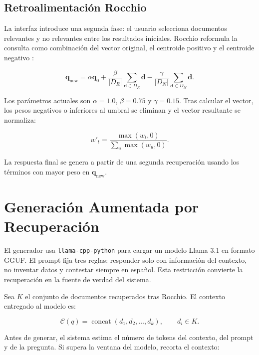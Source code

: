 \documentclass[a4paper]{llncs}
\begin{document}
\subsection{Retroalimentación Rocchio}

La interfaz introduce una segunda fase: el usuario selecciona documentos relevantes y no relevantes entre los resultados iniciales. Rocchio reformula la consulta como combinación del vector original, el centroide positivo y el centroide negativo \cite{rocchio1971relevance}:

\begin{equation}
\mathbf{q}_{\mathrm{new}}=
\alpha \mathbf{q}_0+
\frac{\beta}{|D_R|}\sum_{\mathbf{d}\in D_R}\mathbf{d}
-
\frac{\gamma}{|D_N|}\sum_{\mathbf{d}\in D_N}\mathbf{d}.
\end{equation}

Los parámetros actuales son $\alpha=1.0$, $\beta=0.75$ y $\gamma=0.15$. Tras calcular el vector, los pesos negativos o inferiores al umbral se eliminan y el vector resultante se normaliza:

\begin{equation}
w'_t=
\frac{\max(w_t,0)}
{\sum_{u}\max(w_u,0)}.
\end{equation}

La respuesta final se genera a partir de una segunda recuperación usando los términos con mayor peso en $\mathbf{q}_{\mathrm{new}}$.

\section{Generación Aumentada por Recuperación}

El generador usa \texttt{llama-cpp-python} para cargar un modelo Llama 3.1 en formato GGUF. El prompt fija tres reglas: responder solo con información del contexto, no inventar datos y contestar siempre en español. Esta restricción convierte la recuperación en la fuente de verdad del sistema.

Sea $K$ el conjunto de documentos recuperados tras Rocchio. El contexto entregado al modelo es:

\begin{equation}
\mathcal{C}(q)=\operatorname{concat}\left(d_1,d_2,\ldots,d_k\right),\qquad d_i\in K.
\end{equation}

Antes de generar, el sistema estima el número de tokens del contexto, del prompt y de la pregunta. Si supera la ventana del modelo, recorta el contexto:
\end{document}
